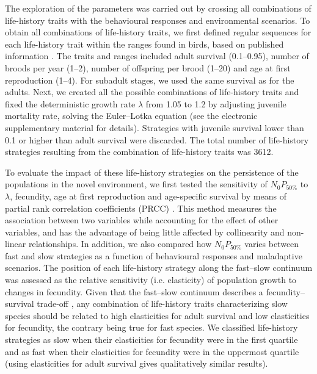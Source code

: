 The exploration of the parameters was carried out by crossing
all combinations of life-history traits with the behavioural
responses and environmental scenarios. To obtain all
combinations of life-history traits, we first defined regular
sequences for each life-history trait within the ranges found
in birds, based on published information \citep{Sol2012a, Sol2018}. The traits
and ranges included adult survival (0.1–0.95), number of
broods per year (1–2), number of offspring per brood (1–20)
and age at first reproduction (1–4). For subadult stages, we
used the same survival as for the adults. Next, we created all
the possible combinations of life-history traits and fixed the
deterministic growth rate $\lambda$ from 1.05 to 1.2 by adjusting juvenile
mortality rate, solving the Euler–Lotka equation (see the
electronic supplementary material for details). Strategies with
juvenile survival lower than 0.1 or higher than adult survival
were discarded. The total number of life-history strategies
resulting from the combination of life-history traits was 3612.

To evaluate the impact of these life-history strategies on
the persistence of the populations in the novel environment,
we first tested the sensitivity of $N_{0}P_{50\%}$ to $\lambda$, fecundity,
age at first reproduction and age-specific survival by means
of partial rank correlation coefficients (PRCC) \citep{saltelli2004sensitivity}. This
method measures the association between two variables
while accounting for the effect of other variables, and has
the advantage of being little affected by collinearity and
non-linear relationships. In addition, we also compared how
$N_{0}P_{50\%}$ varies between fast and slow strategies as a function
of behavioural responses and maladaptive scenarios. The
position of each life-history strategy along the fast–slow continuum
was assessed as the relative sensitivity (i.e. elasticity)
of population growth to changes in fecundity. Given that
the fast–slow continuum describes a fecundity–survival
trade-off \cite{stearns1992evolution}, any combination of life-history traits characterizing
slow species should be related to high elasticities for
adult survival and low elasticities for fecundity, the contrary
being true for fast species. We classified life-history strategies
as slow when their elasticities for fecundity were in the first
quartile and as fast when their elasticities for fecundity were
in the uppermost quartile (using elasticities for adult survival
gives qualitatively similar results).


